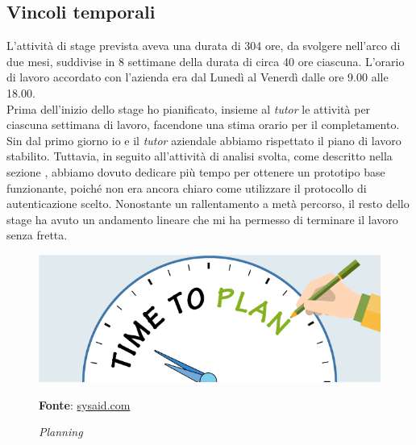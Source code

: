     \subsection{Vincoli temporali}
    L'attività di stage prevista aveva una durata di 304 ore, da svolgere nell'arco di due mesi, suddivise in 8 settimane della durata di circa 40 ore ciascuna. L'orario di lavoro accordato con l'azienda era dal Lunedì al Venerdì dalle ore 9.00 alle 18.00. \\
    Prima dell'inizio dello stage ho pianificato, insieme al \textit{tutor} le attività per ciascuna settimana di lavoro, facendone una stima orario per il completamento. Sin dal primo giorno io e il \textit{tutor} aziendale abbiamo rispettato il piano di lavoro stabilito. Tuttavia, in seguito all'attività di analisi svolta, come descritto nella sezione , abbiamo dovuto dedicare più tempo per ottenere un prototipo base funzionante, poiché non era ancora chiaro come utilizzare il protocollo di autenticazione scelto. Nonostante un rallentamento a metà percorso, il resto dello stage ha avuto un andamento lineare che mi ha permesso di terminare il lavoro senza fretta. 
    
    \begin{figure}[h]
        \centering
        \includegraphics[width=1\textwidth]{immagini/plan.png}
        \caption{\textit{Planning}}
        \textbf{Fonte}:
        \href{https://www.sysaid.com/blog/entry/8-tips-on-how-to-plan-for-configuration-management-part-1}{sysaid.com}
        \label{fig: Planning}
    \end{figure}
    
